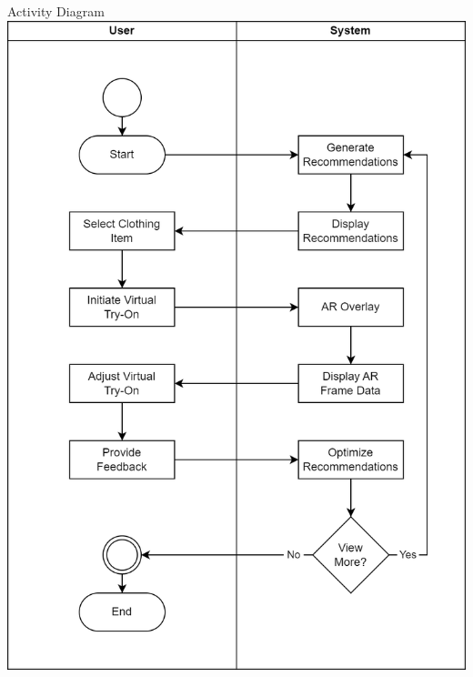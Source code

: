 \begin{frame}{Activity Diagram}
	\centering
	\includegraphics[height=0.8 \textheight]{components/images/activity.png}
\end{frame}

